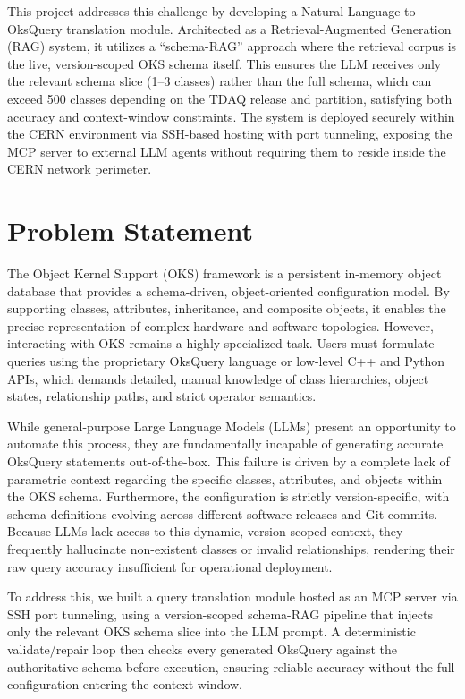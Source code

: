 \documentclass[12pt, a4paper]{report}
\begin{document}
This project addresses this challenge by developing a Natural Language to OksQuery translation module. Architected as a Retrieval-Augmented Generation (RAG) system, it utilizes a ``schema-RAG'' approach where the retrieval corpus is the live, version-scoped OKS schema itself. This ensures the LLM receives only the relevant schema slice (1--3 classes) rather than the full schema, which can exceed 500 classes depending on the TDAQ release and partition, satisfying both accuracy and context-window constraints. The system is deployed securely within the CERN environment via SSH-based hosting with port tunneling, exposing the MCP server to external LLM agents without requiring them to reside inside the CERN network perimeter.

\section{Problem Statement}

The Object Kernel Support (OKS) framework is a persistent in-memory object database that provides a schema-driven, object-oriented configuration model. By supporting classes, attributes, inheritance, and composite objects, it enables the precise representation of complex hardware and software topologies. However, interacting with OKS remains a highly specialized task. Users must formulate queries using the proprietary OksQuery language or low-level C++ and Python APIs, which demands detailed, manual knowledge of class hierarchies, object states, relationship paths, and strict operator semantics.

While general-purpose Large Language Models (LLMs) present an opportunity to automate this process, they are fundamentally incapable of generating accurate OksQuery statements out-of-the-box. This failure is driven by a complete lack of parametric context regarding the specific classes, attributes, and objects within the OKS schema. Furthermore, the configuration is strictly version-specific, with schema definitions evolving across different software releases and Git commits. Because LLMs lack access to this dynamic, version-scoped context, they frequently hallucinate non-existent classes or invalid relationships, rendering their raw query accuracy insufficient for operational deployment.

To address this, we built a query translation module hosted as an MCP server via SSH port tunneling, using a version-scoped schema-RAG pipeline that injects only the relevant OKS schema slice into the LLM prompt. A deterministic validate/repair loop then checks every generated OksQuery against the authoritative schema before execution, ensuring reliable accuracy without the full configuration entering the context window.
\end{document}

